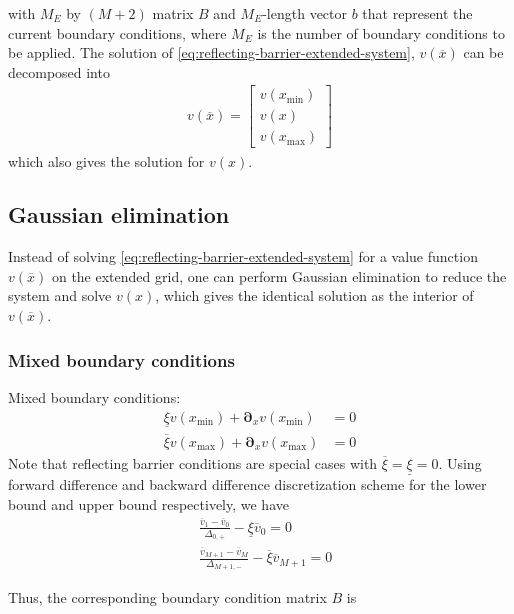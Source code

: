 \documentclass[11pt]{article}
\newcommand{\D}[1][]{\ensuremath{\boldsymbol{\partial}_{#1}}}
\theoremstyle{definition}
\begin{document}
with $M_E$ by $(M+2)$ matrix $B$ and $M_E$-length vector $b$ that represent the current boundary conditions, where $M_E$ is the number of boundary conditions to be applied. The solution of \eqref{eq:reflecting-barrier-extended-system}, $v(\overline{x})$ can be decomposed into 
\begin{align}
v(\overline{x}) = \begin{bmatrix}
v(x_{\min}) \\
v(x) \\
v(x_{\max})
\end{bmatrix}
\end{align}
which also gives the solution for $v(x)$.

\subsection{Gaussian elimination}
Instead of solving \eqref{eq:reflecting-barrier-extended-system} for a value function $v(\overline{x})$ on the extended grid, one can perform Gaussian elimination to reduce the system and solve $v(x)$, which gives the identical solution as the interior of $v(\overline{x})$. 

\subsubsection{Mixed boundary conditions}
Mixed boundary conditions:
\begin{align}
\underline{\xi} v({x_{\min}}) + \D[x]v({x_{\min}} ) &= 0\label{eq:new-BC1}\\
\overline{\xi} v({x_{\max}}) + \D[x]v({x_{\max}}) &= 0\label{eq:new-BC2}
\end{align}
Note that reflecting barrier conditions are special cases with $\overline{\xi} = \underline{\xi} = 0$. Using forward difference and backward difference discretization scheme for the lower bound and upper bound respectively, we have
\begin{align}
&\frac{\overline{v}_1 - \overline{v}_0}{\Delta_{0,+}} - \underline{\xi} \overline{v}_0 = 0 \\
&\frac{\overline{v}_{M+1} - \overline{v}_M}{\Delta_{M+1,-}} - \overline{\xi} \overline{v}_{M+1} = 0
\end{align}

Thus, the corresponding boundary condition matrix $B$ is
\end{document}
